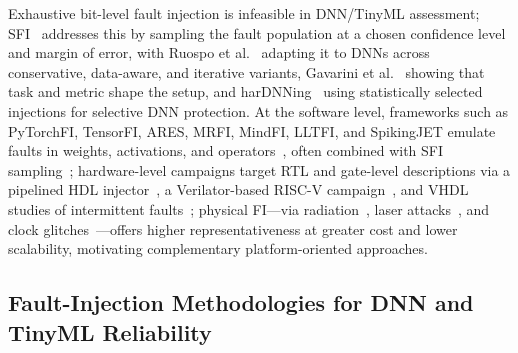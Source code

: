 \documentclass[conference]{IEEEtran}
\begin{document}
Exhaustive bit-level fault injection is infeasible in DNN/TinyML assessment; SFI~\cite{leveugle2009statistical} addresses this by sampling the fault population at a chosen confidence level and margin of error, with Ruospo et al.~\cite{ruospo2023assessing,ruospo2025iterative} adapting it to DNNs across conservative, data-aware, and iterative variants, Gavarini et al.~\cite{Gavarini2023} showing that task and metric shape the setup, and harDNNing~\cite{harDNNing2023} using statistically selected injections for selective DNN protection. At the software level, frameworks such as PyTorchFI, TensorFI, ARES, MRFI, MindFI, LLTFI, and SpikingJET emulate faults in weights, activations, and operators~\cite{Mahmoudetal2020,chen2018tensorfi,reagen2018ares,Huang2023MRFI,Zheng2023,agarwal_lltfi_2021,Gogebakan}, often combined with SFI sampling~\cite{Gavarini2023,ruospo2023assessing}; hardware-level campaigns target RTL and gate-level descriptions via a pipelined HDL injector~\cite{Ruospo2020Pipelined}, a Verilator-based RISC-V campaign~\cite{Porsia2025On}, and VHDL studies of intermittent faults~\cite{Gil2012Studying}; physical FI---via radiation~\cite{Trindade2020Assessment}, laser attacks~\cite{Breier2018Practical}, and clock glitches~\cite{FUKUDA2022Fault,Lee2025Clock}---offers higher representativeness at greater cost and lower scalability, motivating complementary platform-oriented approaches.

\subsection{Fault-Injection Methodologies for DNN and TinyML Reliability}
\label{subsec:related_fi_methodologies}
\end{document}
